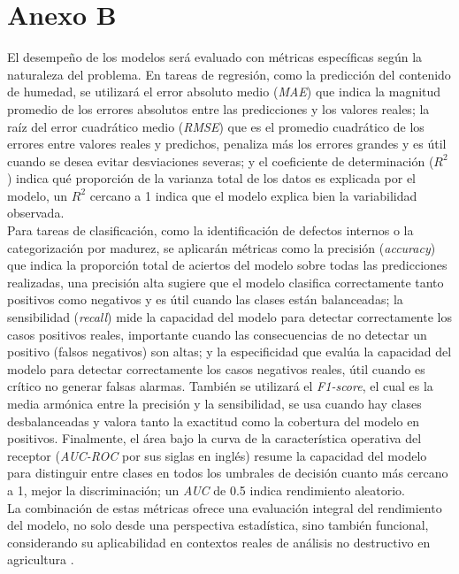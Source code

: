 \chapter*{Anexo B}
\label{AnexoB}

El desempeño de los modelos será evaluado con métricas específicas según la naturaleza del problema. En tareas de regresión, como la predicción del contenido de humedad, se utilizará el error absoluto medio (\textit{MAE}) que indica la magnitud promedio de los errores absolutos entre las predicciones y los valores reales; la raíz del error cuadrático medio (\textit{RMSE}) que es el promedio cuadrático de los errores entre valores reales y predichos, penaliza más los errores grandes y es útil cuando se desea evitar desviaciones severas; y el coeficiente de determinación (\textit{$R^2$}) indica qué proporción de la varianza total de los datos es explicada por el modelo, un \textit{$R^2$} cercano a 1 indica que el modelo explica bien la variabilidad observada.\\

Para tareas de clasificación, como la identificación de defectos internos o la categorización por madurez, se aplicarán métricas como la precisión (\textit{accuracy}) que indica la proporción total de aciertos del modelo sobre todas las predicciones realizadas, una precisión alta sugiere que el modelo clasifica correctamente tanto positivos como negativos y es útil cuando las clases están balanceadas; la sensibilidad (\textit{recall}) mide la capacidad del modelo para detectar correctamente los casos positivos reales, importante cuando las consecuencias de no detectar un positivo (falsos negativos) son altas; y la especificidad que evalúa la capacidad del modelo para detectar correctamente los casos negativos reales, útil cuando es crítico no generar falsas alarmas. También se utilizará el \textit{F1-score}, el cual es la media armónica entre la precisión y la sensibilidad, se usa cuando hay clases desbalanceadas y valora tanto la exactitud como la cobertura del modelo en positivos. Finalmente, el área bajo la curva de la característica operativa del receptor (\textit{AUC-ROC} por sus siglas en inglés) resume la capacidad del modelo para distinguir entre clases en todos los umbrales de decisión cuanto más cercano a 1, mejor la discriminación; un \textit{AUC} de 0.5 indica rendimiento aleatorio.\\

La combinación de estas métricas ofrece una evaluación integral del rendimiento del modelo, no solo desde una perspectiva estadística, sino también funcional, considerando su aplicabilidad en contextos reales de análisis no destructivo en agricultura \parencite{chlingaryan_machine_2018}.

